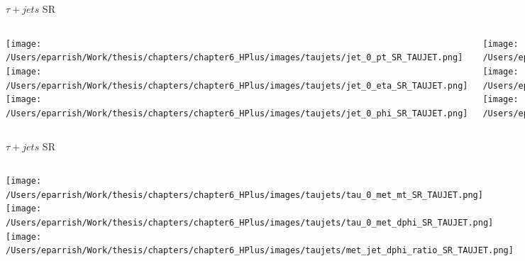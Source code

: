 \documentclass[aspectratio=169,xcolor=table]{beamer}
\begin{document}
    \begin{frame}[t]{$\tau+jets$ SR}
      \begin{columns}[t]
          \texttt{[image: /Users/eparrish/Work/thesis/chapters/chapter6\_HPlus/images/taujets/jet\_0\_pt\_SR\_TAUJET.png]}
          \texttt{[image: /Users/eparrish/Work/thesis/chapters/chapter6\_HPlus/images/taujets/jet\_0\_eta\_SR\_TAUJET.png]}
          \texttt{[image: /Users/eparrish/Work/thesis/chapters/chapter6\_HPlus/images/taujets/jet\_0\_phi\_SR\_TAUJET.png]}

          \texttt{[image: /Users/eparrish/Work/thesis/chapters/chapter6\_HPlus/images/taujets/jet\_1\_pt\_SR\_TAUJET.png]}
          \texttt{[image: /Users/eparrish/Work/thesis/chapters/chapter6\_HPlus/images/taujets/jet\_1\_eta\_SR\_TAUJET.png]}
          \texttt{[image: /Users/eparrish/Work/thesis/chapters/chapter6\_HPlus/images/taujets/jet\_1\_phi\_SR\_TAUJET.png]}

          \texttt{[image: /Users/eparrish/Work/thesis/chapters/chapter6\_HPlus/images/taujets/jet\_2\_pt\_SR\_TAUJET.png]}
          \texttt{[image: /Users/eparrish/Work/thesis/chapters/chapter6\_HPlus/images/taujets/jet\_2\_eta\_SR\_TAUJET.png]}
          \texttt{[image: /Users/eparrish/Work/thesis/chapters/chapter6\_HPlus/images/taujets/jet\_2\_phi\_SR\_TAUJET.png]}

          \texttt{[image: /Users/eparrish/Work/thesis/chapters/chapter6\_HPlus/images/taujets/effm\_tau\_SR\_TAUJET.png]}

      \end{columns}
    \end{frame}

    \begin{frame}[t]{$\tau+jets$ SR}
      \begin{columns}[t]
          \texttt{[image: /Users/eparrish/Work/thesis/chapters/chapter6\_HPlus/images/taujets/tau\_0\_met\_mt\_SR\_TAUJET.png]}
          \texttt{[image: /Users/eparrish/Work/thesis/chapters/chapter6\_HPlus/images/taujets/tau\_0\_met\_dphi\_SR\_TAUJET.png]}
          \texttt{[image: /Users/eparrish/Work/thesis/chapters/chapter6\_HPlus/images/taujets/met\_jet\_dphi\_ratio\_SR\_TAUJET.png]}

          \texttt{[image: /Users/eparrish/Work/thesis/chapters/chapter6\_HPlus/images/taujets/bjet\_0\_met\_dphi\_SR\_TAUJET.png]}
          \texttt{[image: /Users/eparrish/Work/thesis/chapters/chapter6\_HPlus/images/taujets/bjet\_0\_tau\_0\_dr\_SR\_TAUJET.png]}



      \end{columns}
    \end{frame}
\end{document}
